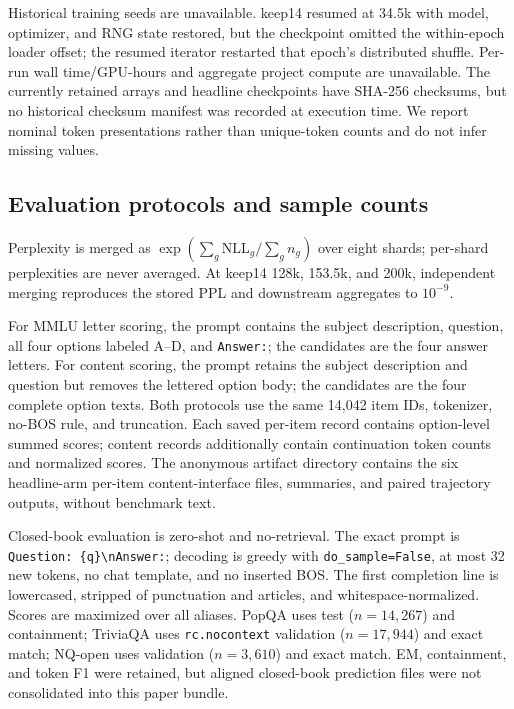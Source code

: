 Historical training seeds are unavailable. keep14 resumed at 34.5k with model,
optimizer, and RNG state restored, but the checkpoint omitted the within-epoch
loader offset; the resumed iterator restarted that epoch's distributed shuffle.
Per-run wall time/GPU-hours and aggregate project compute are unavailable.
The currently retained arrays and headline checkpoints have SHA-256 checksums,
but no historical checksum manifest was recorded at execution time. We report nominal token presentations rather than unique-token counts
and do not infer missing values.

\subsection{Evaluation protocols and sample counts}


Perplexity is merged as
$\exp(\sum_g\mathrm{NLL}_g/\sum_g n_g)$ over eight shards; per-shard
perplexities are never averaged. At keep14 128k, 153.5k, and 200k, independent
merging reproduces the stored PPL and downstream aggregates to $10^{-9}$.

For MMLU letter scoring, the prompt contains the subject description, question,
all four options labeled A--D, and \texttt{Answer:}; the candidates are the
four answer letters. For content scoring, the prompt retains the subject
description and question but removes the lettered option body; the candidates
are the four complete option texts. Both protocols use the same 14,042 item IDs,
tokenizer, no-BOS rule, and truncation. Each saved per-item record contains
option-level summed scores; content records additionally contain continuation
token counts and normalized scores. The anonymous artifact directory contains
the six headline-arm per-item content-interface files, summaries, and paired
trajectory outputs, without benchmark text.

Closed-book evaluation is zero-shot and no-retrieval. The exact prompt is
\texttt{Question: \{q\}\textbackslash nAnswer:}; decoding is greedy with
\texttt{do\_sample=False}, at most 32 new tokens, no chat template, and no
inserted BOS. The first completion line is lowercased, stripped of punctuation
and articles, and whitespace-normalized. Scores are maximized over all aliases.
PopQA uses test ($n{=}14{,}267$) and containment; TriviaQA uses
\texttt{rc.nocontext} validation ($n{=}17{,}944$) and exact match; NQ-open uses
validation ($n{=}3{,}610$) and exact match. EM, containment, and token F1 were
retained, but aligned closed-book prediction files were not consolidated into
this paper bundle.


